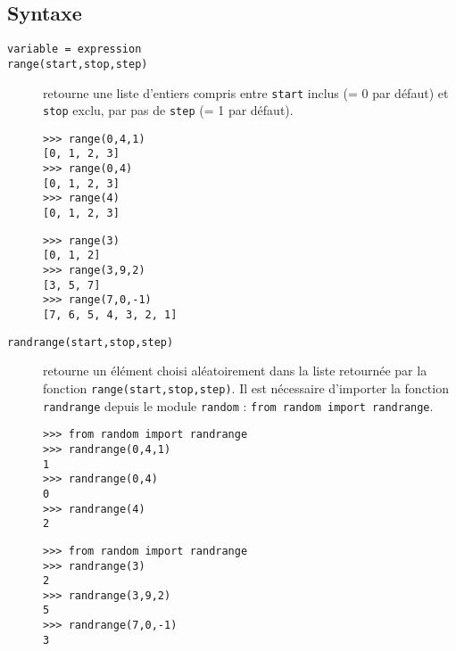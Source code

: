 \subsection{Syntaxe \python}\label{affectation:jeux:python}
\begin{description}
\item[\texttt{variable = expression}]\mbox{}

\item[\texttt{range(start,stop,step)}] retourne une liste d'entiers compris 
	entre \texttt{start} inclus (= 0 par défaut) et \texttt{stop} exclu,
	par pas de \texttt{step} (= 1 par défaut).
\vspace*{2mm}

\begin{minipage}[t]{7cm}\footnotesize
\begin{Verbatim}
>>> range(0,4,1)
[0, 1, 2, 3]
>>> range(0,4)
[0, 1, 2, 3]
>>> range(4)
[0, 1, 2, 3]
\end{Verbatim}
\end{minipage}
\hfill
\begin{minipage}[t]{7cm}\footnotesize
\begin{Verbatim}
>>> range(3)
[0, 1, 2]
>>> range(3,9,2)
[3, 5, 7]
>>> range(7,0,-1)
[7, 6, 5, 4, 3, 2, 1]
\end{Verbatim}
\end{minipage}
\vspace*{2mm}

\item[\texttt{randrange(start,stop,step)}] retourne un élément choisi aléatoirement
	dans la liste retournée par la fonction \texttt{range(start,stop,step)}.
	Il est nécessaire d'importer la fonction \texttt{randrange} depuis le module \texttt{random} :
	\texttt{from random import randrange}.
\vspace*{2mm}
	
\begin{minipage}{7cm}\footnotesize
\begin{Verbatim}
>>> from random import randrange
>>> randrange(0,4,1)
1
>>> randrange(0,4)
0
>>> randrange(4)
2
\end{Verbatim}
\end{minipage}
\hfill
\begin{minipage}{7cm}\footnotesize
\begin{Verbatim}
>>> from random import randrange
>>> randrange(3)
2
>>> randrange(3,9,2)
5
>>> randrange(7,0,-1)
3
\end{Verbatim}
\end{minipage}
\end{description}

